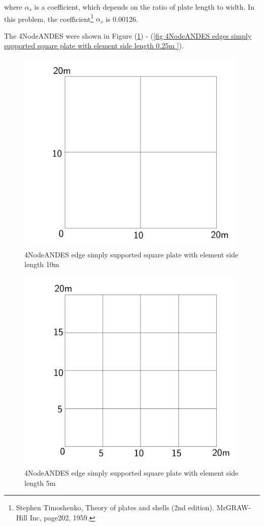 \documentclass[fleqn,11pt]{article}
\begin{document}
where $\alpha_s$ is a coefficient, which depends on the ratio of plate length to width. In this problem, the coefficient\footnote{Stephen Timoshenko, Theory of plates and shells (2nd edition). MrGRAW-Hill Inc, page202, 1959.} $\alpha_s$ is 0.00126.

The 4NodeANDES were shown in Figure (\ref{fig 4NodeANDES edges simply supported square plate with element side length 10m }) - (\ref{fig 4NodeANDES edges simply supported square plate with element side length 0.25m }). 



\begin{figure}[H]
  \centering
  \includegraphics[width=11cm]{../Figure-files/square_plate1.pdf}
  \caption{4NodeANDES edge simply supported square plate with element side length 10m }
  \label{fig 4NodeANDES edges simply supported square plate with element side length 10m }
\end{figure}

\newpage

\begin{figure}[H]
  \centering
  \includegraphics[width=11cm]{../Figure-files/square_plate2.pdf}
  \caption{4NodeANDES edge simply supported square plate with element side length 5m }
  \label{fig 4NodeANDES edges simply supported square plate with element side length 5m }
\end{figure}
\end{document}
